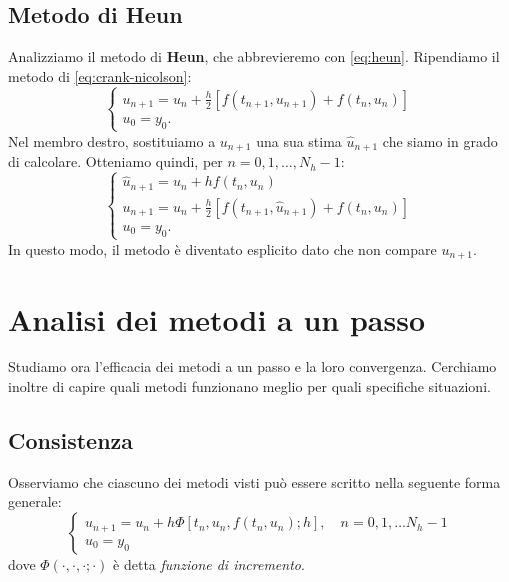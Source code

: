 \subsection{Metodo di Heun}
Analizziamo il metodo di \textbf{Heun}, che abbrevieremo con \eqref{eq:heun}.
Ripendiamo il metodo di \eqref{eq:crank-nicolson}:
\begin{equation*}\tag{CN}
\begin{cases}
u_{n+1} =u_{n} +\frac{h}{2}[ f( t_{n+1} ,u_{n+1}) +f( t_{n} ,u_{n})]\\
u_{0} =y_{0}.
\end{cases}
\end{equation*}
Nel membro destro, sostituiamo a $u_{n+1}$ una sua stima $\hat{u}_{n+1}$ che siamo in grado di calcolare.
Otteniamo quindi, per $n=0,1,\dotsc ,N_{h} -1$:
\begin{equation}\tag{H}
\begin{cases}
\hat{u}_{n+1} =u_{n} +hf( t_{n} ,u_{n})\\
u_{n+1} =u_{n} +\frac{h}{2}[ f( t_{n+1} ,\hat{u}_{n+1}) +f( t_{n} ,u_{n})]\\
u_{0} =y_{0}.
\end{cases}
\label{eq:heun}
\end{equation}
In questo modo, il metodo è diventato esplicito dato che non compare $u_{n+1}$.

\section{Analisi dei metodi a un passo}
Studiamo ora l'efficacia dei metodi a un passo e la loro convergenza.
Cerchiamo inoltre di capire quali metodi funzionano meglio per quali specifiche situazioni.

\subsection{Consistenza}
Osserviamo che ciascuno dei metodi visti può essere scritto nella seguente forma generale:
\begin{equation}
\begin{cases}
u_{n+1} =u_{n} +h\Phi [ t_{n} ,u_{n} ,f( t_{n} ,u_{n}) ;h] ,\quad n=0,1,\dotsc N_{h} -1\\
u_{0} =y_{0}
\end{cases}
\label{eq:forma-generale-1-passo}
\end{equation}
dove $\Phi ( \cdot ,\cdot ,\cdot ;\cdot )$ è detta \textit{funzione di incremento}.

